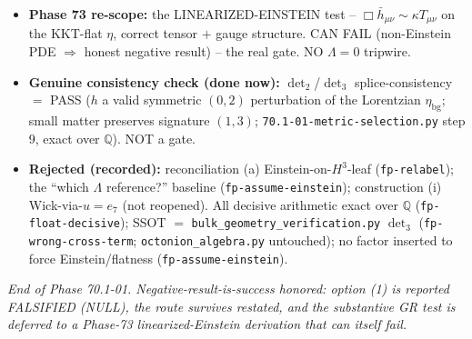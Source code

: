 \begin{itemize}
        $\Lambda$ tripwire.
  \item \textbf{Phase 73 re-scope:} the LINEARIZED-EINSTEIN test --
        $\Box\bar h_{\mu\nu}\sim\kappa T_{\mu\nu}$ on the KKT-flat $\eta$, correct tensor $+$
        gauge structure. CAN FAIL (non-Einstein PDE $\Rightarrow$ honest negative result) --
        the real gate. NO $\Lambda=0$ tripwire.
  \item \textbf{Genuine consistency check (done now):} $\det_2$/$\det_3$ splice-consistency
        $=$ PASS ($h$ a valid symmetric $(0,2)$ perturbation of the Lorentzian
        $\eta_{\mathrm{bg}}$; small matter preserves signature $(1,3)$;
        \texttt{70.1-01-metric-selection.py} step 9, exact over $\mathbb{Q}$). NOT a gate.
  \item \textbf{Rejected (recorded):} reconciliation (a) Einstein-on-$H^3$-leaf
        (\texttt{fp-relabel}); the ``which $\Lambda$ reference?'' baseline
        (\texttt{fp-assume-einstein}); construction (i) Wick-via-$u=e_7$ (not reopened).
        All decisive arithmetic exact over $\mathbb{Q}$ (\texttt{fp-float-decisive}); SSOT
        $=$ \texttt{bulk\_geometry\_verification.py} $\det_3$ (\texttt{fp-wrong-cross-term};
        \texttt{octonion\_algebra.py} untouched); no factor inserted to force
        Einstein/flatness (\texttt{fp-assume-einstein}).
\end{itemize}

\medskip\noindent\emph{End of Phase 70.1-01. Negative-result-is-success honored: option (1)
is reported FALSIFIED (NULL), the route survives restated, and the substantive GR test is
deferred to a Phase-73 linearized-Einstein derivation that can itself fail.}

